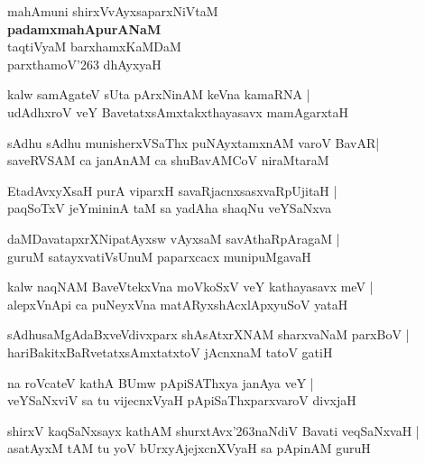\begin{center}
mahAmuni shirxVvAyxsaparxNiVtaM\\
\textbf{\large padamxmahApurANaM}\\
taqtiVyaM barxhamxKaMDaM\\
parxthamoV\char'263 dhAyxyaH
\end{center}

\begin{shloka}
kalw samAgateV sUta pArxNinAM keVna kamaRNA |\\
udAdhxroV veY BavetatxsAmxtakxthayasavx mamAgarxtaH 
\end{shloka}

\begin{shloka}
sAdhu sAdhu munisherxVSaThx puNAyxtamxnAM varoV BavAR|\\
saveRVSAM ca janAnAM ca shuBavAMCoV niraMtaraM
\end{shloka}

\begin{shloka}
EtadAvxyXsaH purA viparxH savaRjacnxsasxvaRpUjitaH |\\
paqSoTxV jeYmininA taM sa yadAha shaqNu veYSaNxva
\end{shloka}

\begin{shloka}
daMDavatapxrXNipatAyxsw vAyxsaM savAthaRpAragaM |\\
guruM satayxvatiVsUnuM paparxcacx munipuMgavaH 
\end{shloka}

\begin{shloka}
kalw naqNAM BaveVtekxVna moVkoSxV veY kathayasavx meV |\\
alepxVnApi ca puNeyxVna matARyxshAcxlApxyuSoV yataH 
\end{shloka}

\begin{shloka}
sAdhusaMgAdaBxveVdivxparx shAsAtxrXNAM sharxvaNaM parxBoV |\\
hariBakitxBaRvetatxsAmxtatxtoV jAcnxnaM tatoV gatiH
\end{shloka}

\begin{shloka}
na roVcateV kathA BUmw pApiSAThxya janAya veY |\\
veYSaNxviV sa tu vijecnxVyaH pApiSaThxparxvaroV divxjaH
\end{shloka}

\begin{shloka}
shirxV kaqSaNxsayx kathAM shurxtAvx\char'263naNdiV Bavati veqSaNxvaH |\\
asatAyxM tAM tu yoV bUrxyAjejxcnXVyaH sa pApinAM guruH 
\end{shloka}

